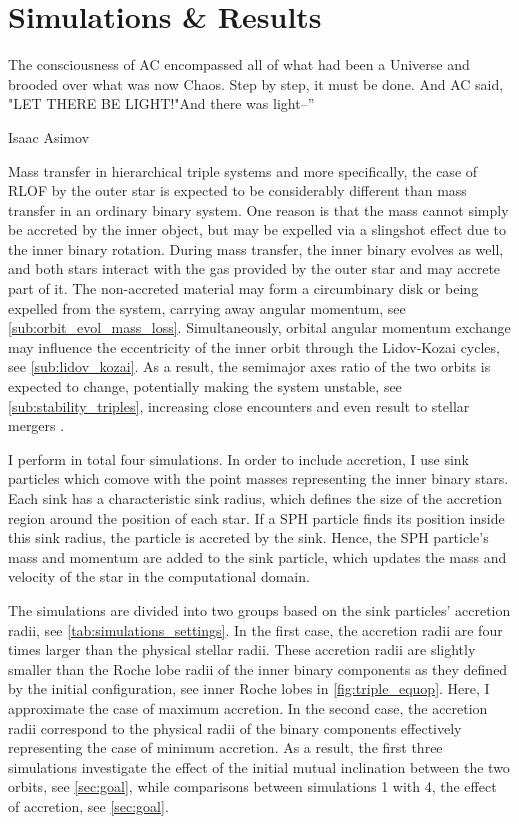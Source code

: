 \chapter{Simulations \& Results}\label{simulations}

\epigraph{The consciousness of AC encompassed all of what had been a Universe and brooded over what was now Chaos. Step by step, it must be done. And AC said, "LET THERE BE LIGHT!"And there was light--”}{Isaac Asimov}


Mass transfer in hierarchical triple
systems and more specifically, the case of RLOF by the outer star is expected to be considerably different than mass transfer in an ordinary binary system. One reason is that the mass cannot simply be accreted by the inner
object, but may be expelled via a slingshot effect due to the inner binary rotation. During mass transfer, the inner binary evolves as well, and both stars interact with the gas provided by the outer star and may accrete part of it. The non-accreted material may form a circumbinary disk or being expelled from the system, carrying away angular momentum, see \cref{sub:orbit_evol_mass_loss}. Simultaneously, orbital angular momentum exchange may influence the eccentricity of the inner orbit through the Lidov-Kozai cycles, see \cref{sub:lidov_kozai}. As a result, the semimajor axes ratio of the two orbits is expected to change, potentially making the system unstable, see \cref{sub:stability_triples}, increasing close encounters and even result to stellar mergers \citep{antonini2017binary,silsbee2017lidov,vigna2021massive}.

I perform in total four simulations. In order to include accretion, I use sink particles which comove with the point masses representing the inner binary stars. Each sink has a characteristic sink radius, which defines the size of the accretion region around the position of each star. If a SPH particle finds its position inside this sink radius, the particle is accreted by the sink. Hence, the SPH particle's mass and momentum are added to the sink particle, which updates the mass and velocity of the star in the computational domain.

The simulations are divided into two groups based on the sink particles' accretion radii, see \cref{tab:simulations_settings}. In the first case, the accretion radii are four times larger than the physical stellar radii. These accretion radii are slightly smaller than the Roche lobe radii of the inner binary components as they defined by the initial configuration, see inner Roche lobes in \cref{fig:triple_equop}. Here, I approximate the case of maximum accretion. In the second case, the accretion radii correspond to the physical radii of the binary components effectively representing the case of minimum accretion. As a result, the first three simulations investigate the effect of the initial mutual inclination between the two orbits, see \cref{sec:goal}, while comparisons between simulations 1 with 4, the effect of accretion, see \cref{sec:goal}. 

